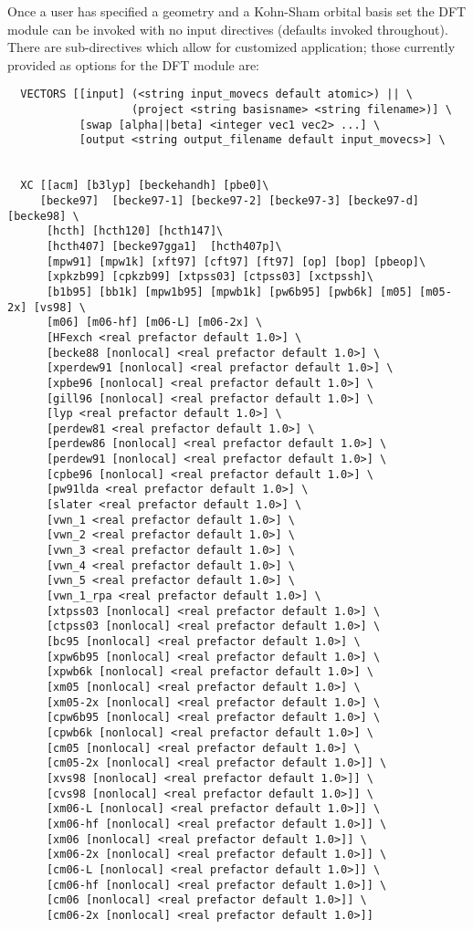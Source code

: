 Once a user has specified a geometry and a Kohn-Sham orbital basis set
the DFT module can be invoked with no input directives (defaults 
invoked throughout).  There are sub-directives which allow for 
customized application; those currently provided as options for 
the DFT module are:
\begin{verbatim}
  VECTORS [[input] (<string input_movecs default atomic>) || \
                   (project <string basisname> <string filename>)] \
           [swap [alpha||beta] <integer vec1 vec2> ...] \
           [output <string output_filename default input_movecs>] \


  XC [[acm] [b3lyp] [beckehandh] [pbe0]\
     [becke97]  [becke97-1] [becke97-2] [becke97-3] [becke97-d] [becke98] \
      [hcth] [hcth120] [hcth147]\
      [hcth407] [becke97gga1]  [hcth407p]\
      [mpw91] [mpw1k] [xft97] [cft97] [ft97] [op] [bop] [pbeop]\
      [xpkzb99] [cpkzb99] [xtpss03] [ctpss03] [xctpssh]\
      [b1b95] [bb1k] [mpw1b95] [mpwb1k] [pw6b95] [pwb6k] [m05] [m05-2x] [vs98] \
      [m06] [m06-hf] [m06-L] [m06-2x] \
      [HFexch <real prefactor default 1.0>] \
      [becke88 [nonlocal] <real prefactor default 1.0>] \
      [xperdew91 [nonlocal] <real prefactor default 1.0>] \
      [xpbe96 [nonlocal] <real prefactor default 1.0>] \
      [gill96 [nonlocal] <real prefactor default 1.0>] \
      [lyp <real prefactor default 1.0>] \
      [perdew81 <real prefactor default 1.0>] \
      [perdew86 [nonlocal] <real prefactor default 1.0>] \
      [perdew91 [nonlocal] <real prefactor default 1.0>] \
      [cpbe96 [nonlocal] <real prefactor default 1.0>] \
      [pw91lda <real prefactor default 1.0>] \
      [slater <real prefactor default 1.0>] \
      [vwn_1 <real prefactor default 1.0>] \
      [vwn_2 <real prefactor default 1.0>] \
      [vwn_3 <real prefactor default 1.0>] \
      [vwn_4 <real prefactor default 1.0>] \
      [vwn_5 <real prefactor default 1.0>] \
      [vwn_1_rpa <real prefactor default 1.0>] \
      [xtpss03 [nonlocal] <real prefactor default 1.0>] \
      [ctpss03 [nonlocal] <real prefactor default 1.0>] \
      [bc95 [nonlocal] <real prefactor default 1.0>] \
      [xpw6b95 [nonlocal] <real prefactor default 1.0>] \
      [xpwb6k [nonlocal] <real prefactor default 1.0>] \
      [xm05 [nonlocal] <real prefactor default 1.0>] \
      [xm05-2x [nonlocal] <real prefactor default 1.0>] \
      [cpw6b95 [nonlocal] <real prefactor default 1.0>] \
      [cpwb6k [nonlocal] <real prefactor default 1.0>] \
      [cm05 [nonlocal] <real prefactor default 1.0>] \
      [cm05-2x [nonlocal] <real prefactor default 1.0>]] \
      [xvs98 [nonlocal] <real prefactor default 1.0>]] \
      [cvs98 [nonlocal] <real prefactor default 1.0>]] \
      [xm06-L [nonlocal] <real prefactor default 1.0>]] \
      [xm06-hf [nonlocal] <real prefactor default 1.0>]] \
      [xm06 [nonlocal] <real prefactor default 1.0>]] \
      [xm06-2x [nonlocal] <real prefactor default 1.0>]] \
      [cm06-L [nonlocal] <real prefactor default 1.0>]] \
      [cm06-hf [nonlocal] <real prefactor default 1.0>]] \
      [cm06 [nonlocal] <real prefactor default 1.0>]] \
      [cm06-2x [nonlocal] <real prefactor default 1.0>]] 




\end{verbatim}
